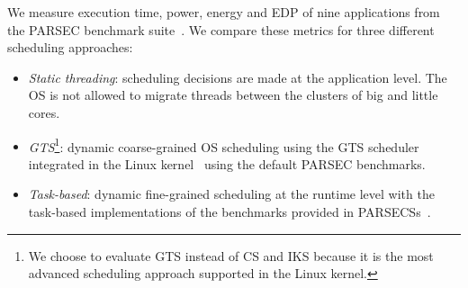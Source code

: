 % 
% 
% 
% 
% 



We measure execution time, power, energy and EDP of nine 
applications from the PARSEC benchmark suite~\cite{Bienia:PhD2011}. We compare these metrics for 
three different scheduling approaches:
\begin{itemize}
\item \textit{Static threading}: scheduling decisions are made at the application level. The OS is not allowed to migrate threads between the clusters of big and little cores. 
\item \textit{GTS}\footnote{We choose to evaluate GTS instead of CS and IKS because it is the most advanced scheduling approach supported in the Linux kernel.}: dynamic coarse-grained OS scheduling 
using the GTS scheduler integrated in the Linux kernel~\cite{samsung, ARM} using the default 
PARSEC benchmarks. 
\item \textit{Task-based}: dynamic fine-grained scheduling at the runtime level with the task-based implementations of the benchmarks provided in PARSECSs~\cite{Chasapis:TACO2016}.
\end{itemize}



